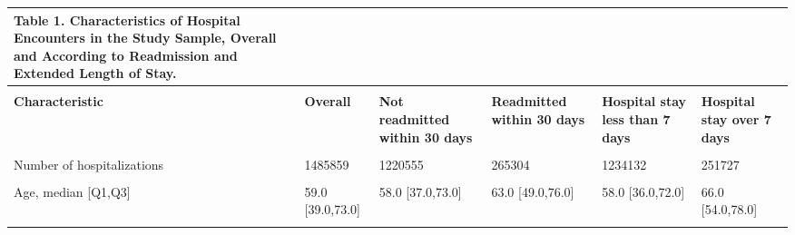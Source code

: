 \begin{adjustbox}{width={\textwidth},totalheight={\textheight},keepaspectratio,frame}%
\sffamily
% 
{%
\begin{tabular}{L{20em}C{10em}C{10em}C{10em}C{10em}C{10em}}
 
{{\textbf{\color{NEJMRed} Table 1.}}
\textbf{Characteristics  of Hospital Encounters in the Study Sample, Overall and According to Readmission and Extended Length of Stay.}}\\[10pt] %
\hline
&                 &                            &                        &                             &                        \\
\textbf{Characteristic}      &     \textbf{Overall} & \textbf{Not readmitted within 30 days} & \textbf{Readmitted within 30 days} & \textbf{Hospital stay less than 7 days} & \textbf{Hospital stay over 7 days} \\
&                 &                            &                        &                             &                        \\
Number of hospitalizations &            1485859 &                       1220555 &                    265304 &                        1234132 &                    251727 \\
&                 &                            &                        &                             &                        \\
Age, median [Q1,Q3] &   59.0 [39.0,73.0] &              58.0 [37.0,73.0] &          63.0 [49.0,76.0] &               58.0 [36.0,72.0] &          66.0 [54.0,78.0] \\
&                 &                            &                        &                             &                        \\

\end{tabular}}
\end{adjustbox}
